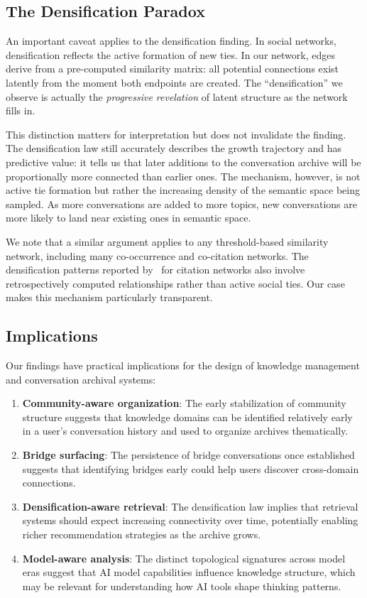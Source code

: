 \documentclass[10pt,letterpaper]{article}
\begin{document}
\subsection{The Densification Paradox}
\label{sec:densification_paradox}

An important caveat applies to the densification finding. In social networks, densification reflects the active formation of new ties. In our network, edges derive from a pre-computed similarity matrix: all potential connections exist latently from the moment both endpoints are created. The ``densification'' we observe is actually the \emph{progressive revelation} of latent structure as the network fills in.

This distinction matters for interpretation but does not invalidate the finding. The densification law still accurately describes the growth trajectory and has predictive value: it tells us that later additions to the conversation archive will be proportionally more connected than earlier ones. The mechanism, however, is not active tie formation but rather the increasing density of the semantic space being sampled. As more conversations are added to more topics, new conversations are more likely to land near existing ones in semantic space.

We note that a similar argument applies to any threshold-based similarity network, including many co-occurrence and co-citation networks. The densification patterns reported by~\citet{leskovec2007graph} for citation networks also involve retrospectively computed relationships rather than active social ties. Our case makes this mechanism particularly transparent.

\subsection{Implications}
\label{sec:implications}

Our findings have practical implications for the design of knowledge management and conversation archival systems:

\begin{enumerate}
  \item \textbf{Community-aware organization}: The early stabilization of community structure suggests that knowledge domains can be identified relatively early in a user's conversation history and used to organize archives thematically.
  \item \textbf{Bridge surfacing}: The persistence of bridge conversations once established suggests that identifying bridges early could help users discover cross-domain connections.
  \item \textbf{Densification-aware retrieval}: The densification law implies that retrieval systems should expect increasing connectivity over time, potentially enabling richer recommendation strategies as the archive grows.
  \item \textbf{Model-aware analysis}: The distinct topological signatures across model eras suggest that AI model capabilities influence knowledge structure, which may be relevant for understanding how AI tools shape thinking patterns.
\end{enumerate}
\end{document}
